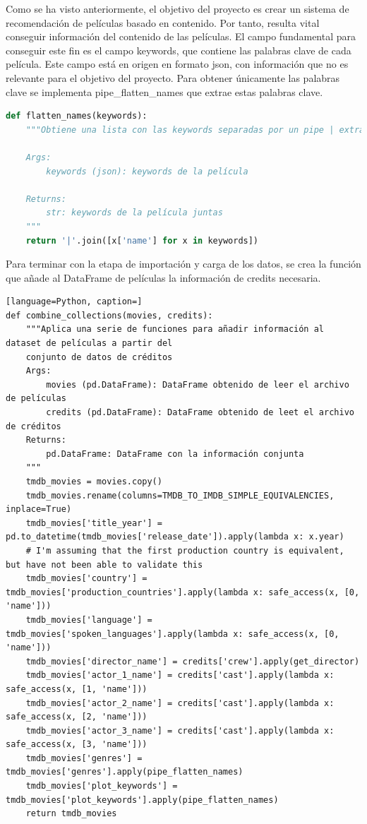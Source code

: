 Como se ha visto anteriormente, el objetivo del proyecto es crear un sistema de recomendación de películas basado en contenido. Por tanto, resulta vital conseguir información del contenido de las películas. El campo fundamental para conseguir este fin es el campo keywords, que contiene las palabras clave de cada película. Este campo está en origen en formato json, con información que no es relevante para el objetivo del proyecto. Para obtener únicamente las palabras clave se implementa pipe\_flatten\_names que extrae estas palabras clave.
\begin{lstlisting}[language=Python, caption= Extracción de las palabras clave a partir del JSON del DataFrame.]
def flatten_names(keywords):
    """Obtiene una lista con las keywords separadas por un pipe | extrayéndolas del JSON.
    
    Args:
        keywords (json): keywords de la película
    
    Returns:
        str: keywords de la película juntas
    """
    return '|'.join([x['name'] for x in keywords])
\end{lstlisting}

Para terminar con la etapa de importación y carga de los datos, se crea la función que añade al DataFrame de películas la información de credits necesaria.
\begin{lstlisting}[language=Python, caption=]
def combine_collections(movies, credits):
    """Aplica una serie de funciones para añadir información al dataset de películas a partir del
    conjunto de datos de créditos
    Args:
        movies (pd.DataFrame): DataFrame obtenido de leer el archivo de películas
        credits (pd.DataFrame): DataFrame obtenido de leet el archivo de créditos
    Returns:
        pd.DataFrame: DataFrame con la información conjunta
    """
    tmdb_movies = movies.copy()
    tmdb_movies.rename(columns=TMDB_TO_IMDB_SIMPLE_EQUIVALENCIES, inplace=True)
    tmdb_movies['title_year'] = pd.to_datetime(tmdb_movies['release_date']).apply(lambda x: x.year)
    # I'm assuming that the first production country is equivalent, but have not been able to validate this
    tmdb_movies['country'] = tmdb_movies['production_countries'].apply(lambda x: safe_access(x, [0, 'name']))
    tmdb_movies['language'] = tmdb_movies['spoken_languages'].apply(lambda x: safe_access(x, [0, 'name']))
    tmdb_movies['director_name'] = credits['crew'].apply(get_director)
    tmdb_movies['actor_1_name'] = credits['cast'].apply(lambda x: safe_access(x, [1, 'name']))
    tmdb_movies['actor_2_name'] = credits['cast'].apply(lambda x: safe_access(x, [2, 'name']))
    tmdb_movies['actor_3_name'] = credits['cast'].apply(lambda x: safe_access(x, [3, 'name']))
    tmdb_movies['genres'] = tmdb_movies['genres'].apply(pipe_flatten_names)
    tmdb_movies['plot_keywords'] = tmdb_movies['plot_keywords'].apply(pipe_flatten_names)
    return tmdb_movies
\end{lstlisting}

